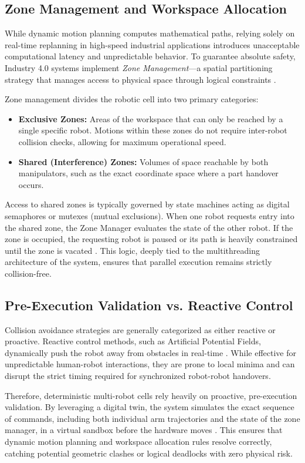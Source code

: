 \subsection{Zone Management and Workspace Allocation}

While dynamic motion planning computes mathematical paths, relying solely on real-time replanning in high-speed industrial applications introduces unacceptable computational latency and unpredictable behavior. To guarantee absolute safety, Industry 4.0 systems implement \textit{Zone Management}—a spatial partitioning strategy that manages access to physical space through logical constraints \cite{michalos2015design}.

Zone management divides the robotic cell into two primary categories:
\begin{itemize}
    \item \textbf{Exclusive Zones:} Areas of the workspace that can only be reached by a single specific robot. Motions within these zones do not require inter-robot collision checks, allowing for maximum operational speed.
    \item \textbf{Shared (Interference) Zones:} Volumes of space reachable by both manipulators, such as the exact coordinate space where a part handover occurs. 
\end{itemize}

Access to shared zones is typically governed by state machines acting as digital semaphores or mutexes (mutual exclusions). When one robot requests entry into the shared zone, the Zone Manager evaluates the state of the other robot. If the zone is occupied, the requesting robot is paused or its path is heavily constrained until the zone is vacated \cite{erdmann1987multiple}. This logic, deeply tied to the multithreading architecture of the system, ensures that parallel execution remains strictly collision-free.

\subsection{Pre-Execution Validation vs. Reactive Control}

Collision avoidance strategies are generally categorized as either reactive or proactive. Reactive control methods, such as Artificial Potential Fields, dynamically push the robot away from obstacles in real-time \cite{khatib1986real}. While effective for unpredictable human-robot interactions, they are prone to local minima and can disrupt the strict timing required for synchronized robot-robot handovers.

Therefore, deterministic multi-robot cells rely heavily on proactive, pre-execution validation. By leveraging a digital twin, the system simulates the exact sequence of commands, including both individual arm trajectories and the state of the zone manager, in a virtual sandbox before the hardware moves \cite{glaessgen2012digital,wang2020digital,kritzinger2018digital}. This ensures that dynamic motion planning and workspace allocation rules resolve correctly, catching potential geometric clashes or logical deadlocks with zero physical risk.
